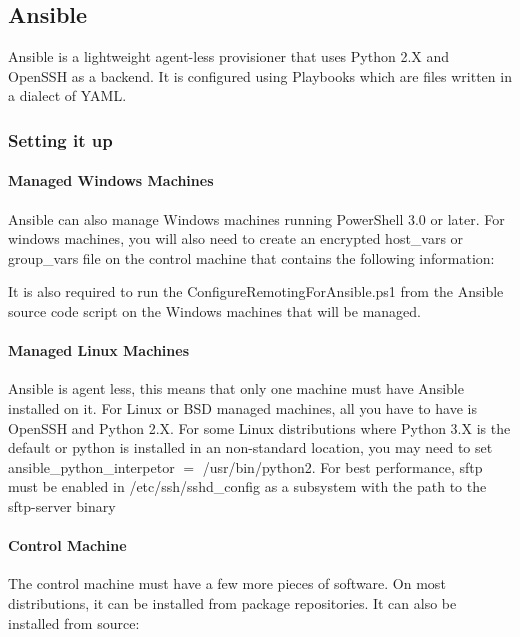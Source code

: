 \subsection{Ansible}
Ansible is a lightweight agent-less provisioner that uses Python 2.X and OpenSSH as a backend.
It is configured using Playbooks which are files written in a dialect of YAML.

\subsubsection{Setting it up}

\paragraph{Managed Windows Machines}
Ansible can also manage Windows machines running PowerShell 3.0 or later.
For windows machines, you will also need to create an encrypted host\_vars or group\_vars file on the control machine that contains the following information:


It is also required to run the ConfigureRemotingForAnsible.ps1 from the Ansible source code script on the Windows machines that will be managed.
\paragraph{Managed Linux Machines}
Ansible is agent less, this means that only one machine must have Ansible installed on it.
For Linux or BSD managed machines, all you have to have is OpenSSH and Python 2.X.
For some Linux distributions where Python 3.X is the default or python is installed in an non-standard location, you may need to set ansible\_python\_interpetor $=$ /usr/bin/python2.
For best performance, sftp must be enabled in /etc/ssh/sshd\_config as a subsystem with the path to the sftp-server binary

\paragraph{Control Machine}
The control machine must have a few more pieces of software.
On most distributions, it can be installed from package repositories.
It can also be installed from source:


